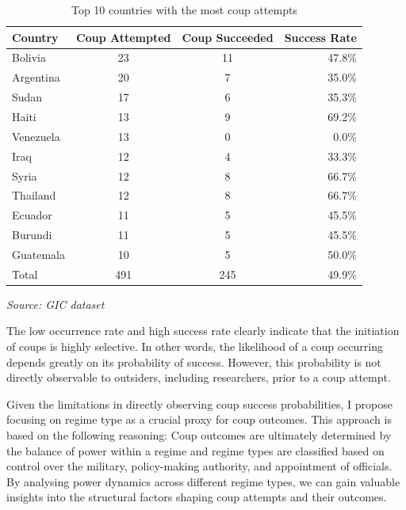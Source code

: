 \documentclass[
  12pt,
]{report}
\begin{document}
\begingroup
\setlength{}
\setlength{}\fontsize{12.0pt}{14.4pt}\selectfont
\setlength{\LTpost}{0mm}

\begin{longtable}{@{\extracolsep{\fill}}lccr}

\caption{\label{tbl-coups}Top 10 countries with the most coup attempts}

\tabularnewline

\toprule
Country & Coup Attempted & Coup Succeeded & Success Rate \\ 
\midrule\addlinespace[2.5pt]
Bolivia & 23 & 11 & 47.8\% \\ 
Argentina & 20 & 7 & 35.0\% \\ 
Sudan & 17 & 6 & 35.3\% \\ 
Haiti & 13 & 9 & 69.2\% \\ 
Venezuela & 13 & 0 & 0.0\% \\ 
Iraq & 12 & 4 & 33.3\% \\ 
Syria & 12 & 8 & 66.7\% \\ 
Thailand & 12 & 8 & 66.7\% \\ 
Ecuador & 11 & 5 & 45.5\% \\ 
Burundi & 11 & 5 & 45.5\% \\ 
Guatemala & 10 & 5 & 50.0\% \\ 
Total & 491 & 245 & 49.9\% \\ 
\bottomrule

\end{longtable}

\begin{minipage}{\linewidth}
\emph{Source: GIC dataset}\\
\end{minipage}
\endgroup

The low occurrence rate and high success rate clearly indicate that the
initiation of coups is highly selective. In other words, the likelihood
of a coup occurring depends greatly on its probability of success.
However, this probability is not directly observable to outsiders,
including researchers, prior to a coup attempt.

Given the limitations in directly observing coup success probabilities,
I propose focusing on regime type as a crucial proxy for coup outcomes.
This approach is based on the following reasoning: Coup outcomes are
ultimately determined by the balance of power within a regime and regime
types are classified based on control over the military, policy-making
authority, and appointment of officials. By analysing power dynamics
across different regime types, we can gain valuable insights into the
structural factors shaping coup attempts and their outcomes.
\end{document}
